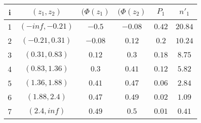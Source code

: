\begin{tabular}{|c|c|c|c|c|c|}
    \hline
    i & $(z_1, z_2)$ & $(\Phi(z_1)$ & $(\Phi(z_2)$ & $P_1$ & $n'_1$\\
    \hline
    1 & $(-inf, -0.21)$ & $-0.5$ & $-0.08$ & $0.42$ & $20.84$\\
    \hline
    2 & $(-0.21, 0.31)$ & $-0.08$ & $0.12$ & $0.2$ & $10.24$\\
    \hline
    3 & $(0.31, 0.83)$ & $0.12$ & $0.3$ & $0.18$ & $8.75$\\
    \hline
    4 & $(0.83, 1.36)$ & $0.3$ & $0.41$ & $0.12$ & $5.82$\\
    \hline
    5 & $(1.36, 1.88)$ & $0.41$ & $0.47$ & $0.06$ & $2.84$\\
    \hline
    6 & $(1.88, 2.4)$ & $0.47$ & $0.49$ & $0.02$ & $1.09$\\
    \hline
    7 & $(2.4, inf)$ & $0.49$ & $0.5$ & $0.01$ & $0.41$\\
    \hline
\end{tabular}